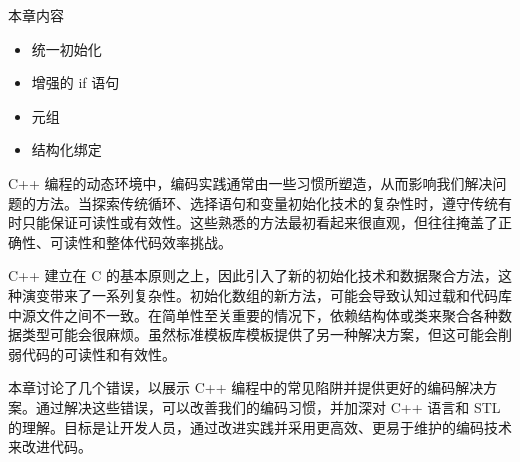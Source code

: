 本章内容

\begin{itemize}
\item
统一初始化

\item
增强的 if 语句

\item
元组

\item
结构化绑定
\end{itemize}

C++ 编程的动态环境中，编码实践通常由一些习惯所塑造，从而影响我们解决问题的方法。当探索传统循环、选择语句和变量初始化技术的复杂性时，遵守传统有时只能保证可读性或有效性。这些熟悉的方法最初看起来很直观，但往往掩盖了正确性、可读性和整体代码效率挑战。

C++ 建立在 C 的基本原则之上，因此引入了新的初始化技术和数据聚合方法，这种演变带来了一系列复杂性。初始化数组的新方法，可能会导致认知过载和代码库中源文件之间不一致。在简单性至关重要的情况下，依赖结构体或类来聚合各种数据类型可能会很麻烦。虽然标准模板库模板提供了另一种解决方案，但这可能会削弱代码的可读性和有效性。

本章讨论了几个错误，以展示 C++ 编程中的常见陷阱并提供更好的编码解决方案。通过解决这些错误，可以改善我们的编码习惯，并加深对 C++ 语言和 STL 的理解。目标是让开发人员，通过改进实践并采用更高效、更易于维护的编码技术来改进代码。











